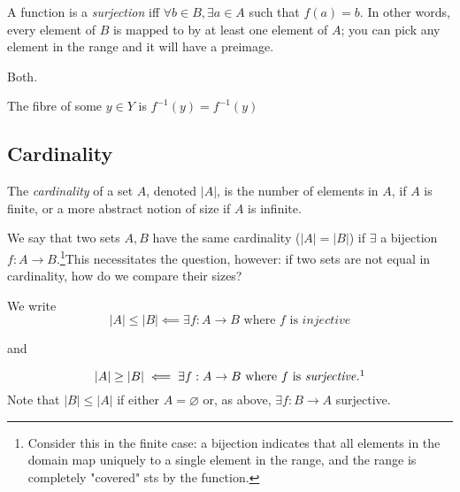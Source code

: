 \documentclass[12pt,oneside]{article}
\begin{document}
\begin{definition}[Surjective]
  A function is a \emph{surjection} iff $\forall b \in B, \exists a \in A$ such that $f(a) = b$. In other words, every element of $B$ is mapped to by at least one element of $A$; you can pick any element in the range and it will have a preimage.
\end{definition}

\begin{definition}[Bijective]
  Both.
\end{definition}

\begin{definition}[Fibre]
The fibre of some $y \in Y$ is $f^{-1}({y}) = f^{-1}(y)$
\end{definition}

\subsection{Cardinality}
\begin{definition}[Cardinality]
  The \emph{cardinality} of a set $A$, denoted $|A|$, is the number of elements in $A$, if $A$ is finite, or a more abstract notion of size if $A$ is infinite.
\end{definition}

We say that two sets $A, B$ have the same cardinality ($|A|=|B|$) if $\exists$ a bijection $f: A \to B$.\footnote{Consider this in the finite case: a bijection indicates that all elements in the domain map uniquely to a single element in the range, and the range is completely "covered" sts by the function.}This necessitates the question, however: if two sets are not equal in cardinality, how do we compare their sizes?

We write 
\[|A| \leq |B| \impliedby \exists f : A \to B \text{ where } f \text{ is } \textit{injective}\]

and 

\[|A| \geq |B| \impliedby \exists f: A \to B \text{ where } f \text{ is } \textit{surjective.}\footnotemark\] Note that $|B| \leq |A|$ if either $A = \varnothing$ or, as above, $\exists f: B \to A$ surjective.
\end{document}
